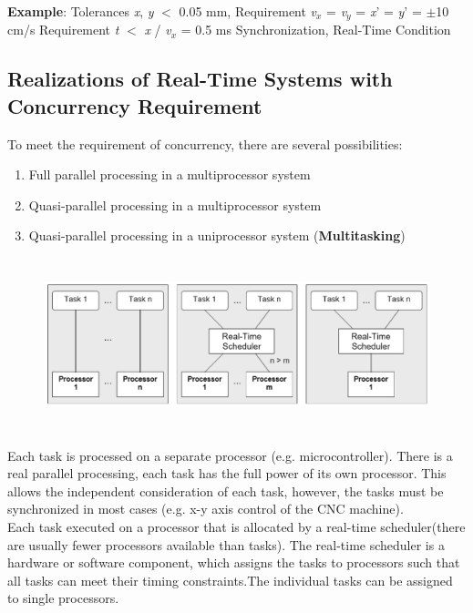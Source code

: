 \textbf{Example}: Tolerances {\textbar}\textit{x}{\textbar}, {\textbar}\textit{y}{\textbar} $\mathrm{<}$ 0.05 mm,   Requirement    \textit{v${}_{x}$} = \textit{v${}_{y}$} = \textit{x}' = \textit{y}' = $\mathrm{\pm}$10 cm/s     Requirement     {\textbar}\textit{t}{\textbar} $\mathrm{<}$ {\textbar}\textit{x}{\textbar} / {\textbar}\textit{v${}_{x}$}{\textbar} = 0.5 ms       Synchronization, Real-Time Condition

\subsection{Realizations of Real-Time Systems with Concurrency Requirement}

To meet the requirement of concurrency, there are several possibilities:

\begin{enumerate}
	\item  Full parallel processing in a multiprocessor system
	\item  Quasi-parallel processing in a multiprocessor system
	\item  Quasi-parallel processing in a uniprocessor system (\textbf{Multitasking})
\end{enumerate}

	\begin{figure}[h]
    \centering
    \includegraphics[width=15cm, height=5cm]{Images/image70.png}
    \label{fig:Fig 16}
    \end{figure}
    
Each task is processed on a separate processor (e.g. microcontroller). There is a real parallel processing, each task has the full power of its own processor. This allows the independent consideration of each task, however, the tasks must be synchronized in most cases (e.g. x-y axis control of the CNC machine).\\

Each task executed on a processor that is allocated by a real-time scheduler(there are usually fewer processors available than tasks). The real-time scheduler is a hardware or software component, which assigns the tasks to processors such that all tasks can meet their timing constraints.The individual tasks can be assigned to single processors.\\

